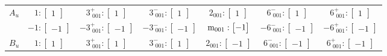 \documentclass[fleqn,8pt,landscape]{jsarticle}
\begin{document}
\begin{longtable}{ccccccc}
$ A_{u} $ & $ 1:\begin{bmatrix} 1 \end{bmatrix} $ & $ 3^{+}_{\,\,001}:\begin{bmatrix} 1 \end{bmatrix} $ & $ 3^{-}_{\,\,001}:\begin{bmatrix} 1 \end{bmatrix} $ & $ 2{}_{001}:\begin{bmatrix} 1 \end{bmatrix} $ & $ 6^{-}_{\,\,001}:\begin{bmatrix} 1 \end{bmatrix} $ & $ 6^{+}_{\,\,001}:\begin{bmatrix} 1 \end{bmatrix} $ \\
& $ -1:\begin{bmatrix} -1 \end{bmatrix} $ & $ -3^{+}_{\,\,001}:\begin{bmatrix} -1 \end{bmatrix} $ & $ -3^{-}_{\,\,001}:\begin{bmatrix} -1 \end{bmatrix} $ & $ {\rm m}_{001}:\begin{bmatrix} -1 \end{bmatrix} $ & $ -6^{-}_{\,\,001}:\begin{bmatrix} -1 \end{bmatrix} $ & $ -6^{+}_{\,\,001}:\begin{bmatrix} -1 \end{bmatrix} $ \\ \hline
$ B_{u} $ & $ 1:\begin{bmatrix} 1 \end{bmatrix} $ & $ 3^{+}_{\,\,001}:\begin{bmatrix} 1 \end{bmatrix} $ & $ 3^{-}_{\,\,001}:\begin{bmatrix} 1 \end{bmatrix} $ & $ 2{}_{001}:\begin{bmatrix} -1 \end{bmatrix} $ & $ 6^{-}_{\,\,001}:\begin{bmatrix} -1 \end{bmatrix} $ & $ 6^{+}_{\,\,001}:\begin{bmatrix} -1 \end{bmatrix} $ \\

\end{longtable}
\end{document}
